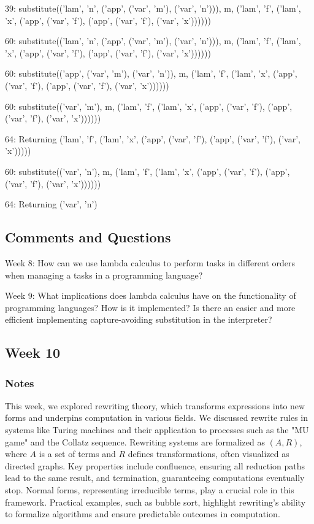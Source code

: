 \documentclass{article}
\theoremstyle{theorem}
\theoremstyle{definition}
\theoremstyle{remark}
\begin{document}
39: substitute(('lam', 'n', ('app', ('var', 'm'), ('var', 'n'))), m, ('lam', 'f', ('lam', 'x', ('app', ('var', 'f'), ('app', ('var', 'f'), ('var', 'x'))))))

60: substitute(('lam', 'n', ('app', ('var', 'm'), ('var', 'n'))), m, ('lam', 'f', ('lam', 'x', ('app', ('var', 'f'), ('app', ('var', 'f'), ('var', 'x'))))))

60: substitute(('app', ('var', 'm'), ('var', 'n')), m, ('lam', 'f', ('lam', 'x', ('app', ('var', 'f'), ('app', ('var', 'f'), ('var', 'x'))))))

60: substitute(('var', 'm'), m, ('lam', 'f', ('lam', 'x', ('app', ('var', 'f'), ('app', ('var', 'f'), ('var', 'x'))))))

64: Returning ('lam', 'f', ('lam', 'x', ('app', ('var', 'f'), ('app', ('var', 'f'), ('var', 'x')))))

60: substitute(('var', 'n'), m, ('lam', 'f', ('lam', 'x', ('app', ('var', 'f'), ('app', ('var', 'f'), ('var', 'x'))))))

64: Returning ('var', 'n')

\subsection*{Comments and Questions}
Week 8: How can we use lambda calculus to perform tasks in different orders when managing a tasks in a programming language?

Week 9: What implications does lambda calculus have on the functionality of programming languages? How is it implemented? Is there an easier and more efficient implementing capture-avoiding substitution in the interpreter?


\subsection{Week 10}

\subsubsection*{Notes}
This week, we explored rewriting theory, which transforms expressions into new forms and underpins computation in various fields. We discussed rewrite rules in systems like Turing machines and their application to processes such as the "MU game" and the Collatz sequence. Rewriting systems are formalized as \((A, R)\), where \(A\) is a set of terms and \(R\) defines transformations, often visualized as directed graphs. Key properties include confluence, ensuring all reduction paths lead to the same result, and termination, guaranteeing computations eventually stop. Normal forms, representing irreducible terms, play a crucial role in this framework. Practical examples, such as bubble sort, highlight rewriting's ability to formalize algorithms and ensure predictable outcomes in computation.
\end{document}
